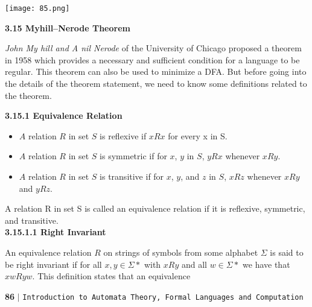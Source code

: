 \documentclass{article}
\begin{document}
\begin{center}

\texttt{[image: 85.png]}
\end{center}


\large{
\textbf{3.15 Myhill–Nerode Theorem}
}

\vspace*{0.2cm}
\emph{John My hill and A nil Nerode} of the University of Chicago proposed a theorem in 1958 which provides
a necessary and sufficient condition for a language to be regular. This theorem can also be used to
minimize a DFA. But before going into the details of the theorem statement, we need to know some
definitions related to the theorem.

\vspace*{0.4cm}
\large{
\textbf{3.15.1 Equivalence Relation}
}

\vspace*{0.2cm}
\begin{itemize}
  \item $A$ relation $R$ in set $S$ is reflexive if $xRx$ for every x in S.\\
  \item $A$ relation $R$ in set $S$ is symmetric if for $x$, $y$ in $S$, $yRx$ whenever $xRy$.\\
  \item $A$ relation $R$ in set $S$ is transitive if for $x$, $y$, and $z$ in $S$, $xRz$ whenever $xRy$ and $yRz$.\\
\end{itemize}

\vspace*{0.2cm}
A relation R in set S is called an equivalence relation if it is reflexive, symmetric, and transitive.\\

\vspace*{0.4cm}
\large{
\textbf{3.15.1.1 Right Invariant}\\
}

\vspace*{0.2cm}
An equivalence relation $R$ on strings of symbols from some alphabet $\Sigma$ is said to be right invariant if for
all $x, y \in \Sigma*$ with $xRy$ and all $w \in \Sigma*$ we have that $xw R yw$. This definition states that an equivalence\\

\newpage
\begin{flushleft}
    \textbf{86}\hspace*{0.1cm} \textbf{$|$} \hspace*{0.1cm} \texttt{Introduction to Automata Theory, Formal Languages and Computation}
  \end{flushleft}
\end{document}
